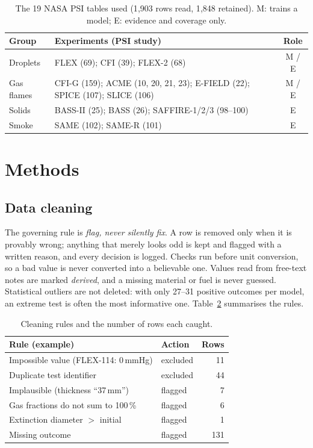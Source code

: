 \documentclass[11pt,twocolumn]{article}
\newcommand{\pct}{\,\%}
\begin{document}
\begin{table}[t]
\centering
\caption{The 19 NASA PSI tables used (1{,}903 rows read, 1{,}848 retained). M: trains a model; E: evidence
and coverage only.}
\label{tab:sources}
\small
\begin{tabularx}{\columnwidth}{@{}l X c@{}}
\toprule
Group & Experiments (PSI study) & Role \\
\midrule
Droplets & FLEX (69); CFI (39); FLEX-2 (68) & M / E \\
Gas flames & CFI-G (159); ACME (10, 20, 21, 23); E-FIELD (22); SPICE (107); SLICE (106) & M / E \\
Solids & BASS-II (25); BASS (26); SAFFIRE-1/2/3 (98--100) & E \\
Smoke & SAME (102); SAME-R (101) & E \\
\bottomrule
\end{tabularx}
\end{table}

\section{Methods}

\subsection{Data cleaning}

The governing rule is \emph{flag, never silently fix}. A row is removed only when it is provably wrong;
anything that merely looks odd is kept and flagged with a written reason, and every decision is logged.
Checks run before unit conversion, so a bad value is never converted into a believable one. Values read
from free-text notes are marked \emph{derived}, and a missing material or fuel is never guessed. Statistical
outliers are not deleted: with only 27--31 positive outcomes per model, an extreme test is often the most
informative one. Table~\ref{tab:cleaning} summarises the rules.

\begin{table}[t]
\centering
\caption{Cleaning rules and the number of rows each caught.}
\label{tab:cleaning}
\small
\begin{tabularx}{\columnwidth}{@{}X l r@{}}
\toprule
Rule (example) & Action & Rows \\
\midrule
Impossible value (FLEX-114: 0\,mmHg) & excluded & 11 \\
Duplicate test identifier & excluded & 44 \\
Implausible (thickness ``37\,mm'') & flagged & 7 \\
Gas fractions do not sum to 100\pct & flagged & 6 \\
Extinction diameter $>$ initial & flagged & 1 \\
Missing outcome & flagged & 131 \\
\bottomrule
\end{tabularx}
\end{table}
\end{document}
